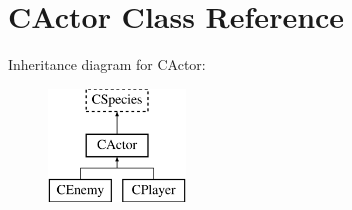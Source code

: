 \hypertarget{class_c_actor}{}\section{C\+Actor Class Reference}
\label{class_c_actor}
Inheritance diagram for C\+Actor\+:\begin{figure}[H]
\begin{center}
\leavevmode
\includegraphics[height=3.000000cm]{class_c_actor}
\end{center}
\end{figure}
